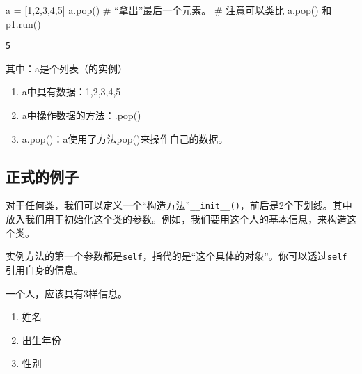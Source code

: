 \documentclass[
  letterpaper,
  DIV=11,
  numbers=noendperiod]{scrreprt}
\newenvironment{Shaded}{\begin{snugshade}}{\end{snugshade}}
\newcommand{\CommentTok}[1]{\textcolor[rgb]{0.37,0.37,0.37}{#1}}
\newcommand{\DecValTok}[1]{\textcolor[rgb]{0.68,0.00,0.00}{#1}}
\newcommand{\NormalTok}[1]{\textcolor[rgb]{0.00,0.23,0.31}{#1}}
\newcommand{\OperatorTok}[1]{\textcolor[rgb]{0.37,0.37,0.37}{#1}}
\providecommand{\tightlist}{%
  \setlength{\itemsep}{0pt}\setlength{\parskip}{0pt}}\usepackage{longtable,booktabs,array}
\begin{document}
\begin{Shaded}
\begin{Highlighting}[]
\NormalTok{a }\OperatorTok{=}\NormalTok{ [}\DecValTok{1}\NormalTok{,}\DecValTok{2}\NormalTok{,}\DecValTok{3}\NormalTok{,}\DecValTok{4}\NormalTok{,}\DecValTok{5}\NormalTok{]}
\NormalTok{a.pop() }\CommentTok{\# “拿出”最后一个元素。}
\CommentTok{\# 注意可以类比 a.pop() 和p1.run()}
\end{Highlighting}
\end{Shaded}

\begin{verbatim}
5
\end{verbatim}

其中：a是个列表（的实例）

\begin{enumerate}
\def\labelenumi{\arabic{enumi}.}
\tightlist
\item
  a中具有数据：1,2,3,4,5
\item
  a中操作数据的方法：.pop()
\item
  a.pop()：a使用了方法pop()来操作自己的数据。
\end{enumerate}

\hypertarget{ux6b63ux5f0fux7684ux4f8bux5b50}{%
\subsection{正式的例子}\label{ux6b63ux5f0fux7684ux4f8bux5b50}}

对于任何类，我们可以定义一个``构造方法''\texttt{\_\_init\_\_()}，前后是2个下划线。其中放入我们用于初始化这个类的参数。例如，我们要用这个人的基本信息，来构造这个类。

实例方法的第一个参数都是\texttt{self}，指代的是``这个具体的对象''。你可以透过\texttt{self}引用自身的信息。

一个人，应该具有3样信息。

\begin{enumerate}
\def\labelenumi{\arabic{enumi}.}
\tightlist
\item
  姓名
\item
  出生年份
\item
  性别
\end{enumerate}
\end{document}
